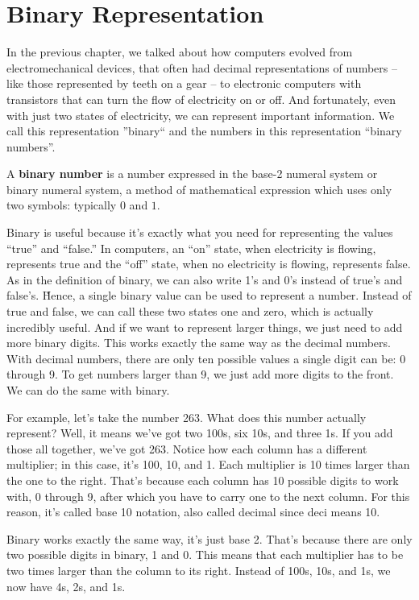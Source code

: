 \section{Binary Representation}

In the previous chapter, we talked about how computers evolved from electromechanical devices, that often had decimal
representations of numbers – like those represented by teeth on a gear – to electronic computers with transistors
that can turn the flow of electricity on or off. And fortunately, even with just two states of electricity, we can
represent important information. We call this representation ''binary`` and the numbers in this representation
``binary numbers''.

A \textbf{binary number} is a number expressed in the base-2 numeral system or binary numeral system, a method of
mathematical expression which uses only two symbols: typically $0$ and $1$.
\ed

Binary is useful because it's exactly what you need for representing the values ``true'' and ``false.'' In computers,
an ``on'' state, when electricity is flowing, represents true and the ``off'' state, when no electricity is flowing,
represents false. As in the definition of binary, we can also write 1's and 0's instead of true's and false's. \v

Hence, a single binary value can be used to represent a number. Instead of true and false, we can call these two
states one and zero, which is actually incredibly useful. And if we want to represent larger things, we just need to
add more binary digits. This works exactly the same way as the decimal numbers. With decimal numbers, there are only
ten possible values a single digit can be: 0 through 9. To get numbers larger than 9, we just add more digits to the
front. We can do the same with binary.

\be
For example, let's take the number 263. What does this number actually represent? Well, it means we've got two 100s,
six 10s, and three 1s. If you add those all together, we've got 263. Notice how each column has a different
multiplier; in this case, it's 100, 10, and 1. Each multiplier is 10 times larger than the one to the right. That's
because each column has 10 possible digits to work with, 0 through 9, after which you have to carry one to the next
column. For this reason, it's called base 10 notation, also called decimal since deci means 10.
\ee

Binary works exactly the same way, it's just base 2. That's because there are only two possible digits in binary, 1
and 0. This means that each multiplier has to be two times larger than the column to its right. Instead of 100s, 10s,
and 1s, we now have 4s, 2s, and 1s.

